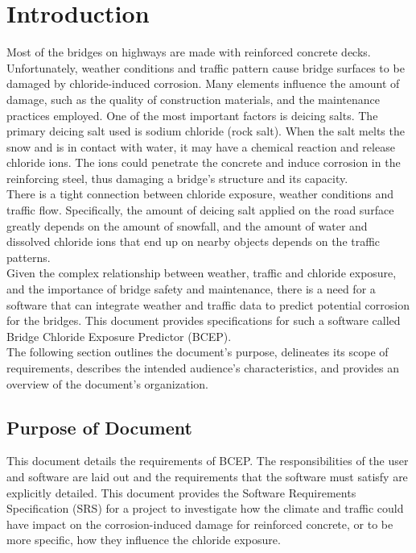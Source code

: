 \documentclass[12pt]{article}
\begin{document}
\break


\section{Introduction}
Most of the bridges on highways are made with reinforced concrete decks. Unfortunately, weather conditions and traffic pattern cause bridge surfaces to be damaged by chloride-induced corrosion. Many elements influence the amount of damage, such as the quality of construction materials, and the maintenance practices employed. One of the most important factors is deicing salts. The primary deicing salt used is sodium chloride (rock salt). When the salt melts the snow and is in contact with water, it may have a chemical reaction and release chloride ions. The ions could penetrate the concrete and induce corrosion in the reinforcing steel, thus damaging a bridge's structure and its capacity. \\
There is a tight connection between chloride exposure, weather conditions and traffic flow. Specifically, the amount of deicing salt applied on the road surface greatly depends on the amount of snowfall, and the amount of water and dissolved chloride ions that end up on nearby objects depends on the traffic patterns.\\
Given the complex relationship between weather, traffic and chloride exposure, and the importance of bridge safety and maintenance, there is a need for a software that can integrate weather and traffic data to predict potential corrosion for the bridges. This document provides specifications for such a software called Bridge Chloride Exposure Predictor (BCEP). \\
The following section outlines the document's purpose, delineates its scope of requirements, describes the intended audience's characteristics, and provides an overview of the document's organization.

\subsection{Purpose of Document}
This document details the requirements of BCEP. The
responsibilities of the user and software are laid out and the requirements that the software must satisfy are explicitly detailed. This document provides the Software Requirements Specification (SRS) for a project to investigate how the climate and traffic could have impact on the corrosion-induced damage for reinforced concrete, or to be more specific, how they influence the chloride exposure. 
\end{document}
